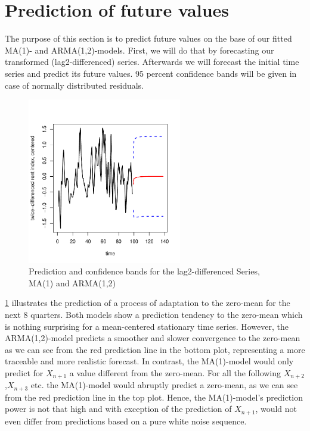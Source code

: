 \documentclass[11pt,a4paper]{article}
\begin{document}

\section{Prediction of future values}

The purpose of this section is to predict future values on the base of our fitted MA(1)- and ARMA(1,2)-models.
First, we will do that by forecasting our transformed (lag2-differenced) series.
Afterwards we will forecast the initial time series and predict its future values.
95 percent confidence bands will be given in case of normally distributed residuals.

\begin{figure}
    \centering
    \includegraphics[width=0.6\textwidth]{pred_transformed_series}
    \caption{Prediction and confidence bands for the lag2-differenced Series, MA(1) and ARMA(1,2)}
    \label{fig:pred_transformed_series}
\end{figure}

\cref{fig:pred_transformed_series} illustrates the prediction of a process of adaptation to the zero-mean for the next 8 quarters.
Both models show a prediction tendency to the zero-mean which is nothing surprising for a mean-centered stationary time series.
However, the ARMA(1,2)-model predicts a smoother and slower convergence to the zero-mean as we can see from the red prediction line in the bottom plot, representing a more traceable and more realistic forecast.
In contrast, the MA(1)-model would only predict for $X_{n+1}$ a value different from the zero-mean.
For all the following $X_{n+2}$,$X_{n+3}$ etc. the MA(1)-model would abruptly predict a zero-mean, as we can see from the red prediction line in the top plot.
Hence, the MA(1)-model's prediction power is not that high and with exception of the prediction of $X_{n+1}$, would not even differ from predictions based on a pure white noise sequence.
\end{document}
